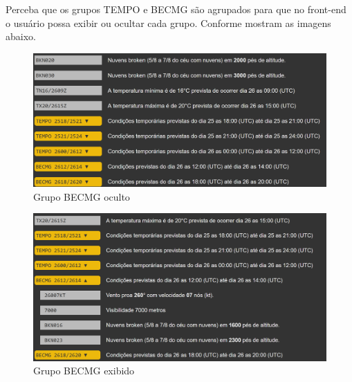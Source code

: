 Perceba que os grupos TEMPO e BECMG são
agrupados para que no front-end o usuário possa exibir ou ocultar cada grupo. Conforme mostram
as imagens abaixo.

\begin{figure}[ht]
    \begin{center}
    \includegraphics[width=400pt]{img/BECMG-oculto.png}
    \caption{Grupo BECMG oculto}
    \label{fig:becmg-oculto}
    \end{center}
\end{figure}

\begin{figure}[ht]
    \begin{center}
    \includegraphics[width=400pt]{img/BECMG-exibido.png}
    \caption{Grupo BECMG exibido}
    \label{fig:becmg-exibido}
    \end{center}
\end{figure}


